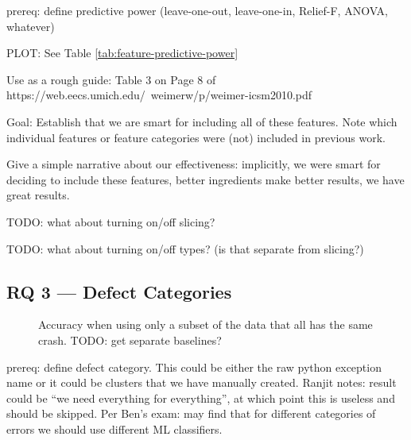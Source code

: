 \documentclass[conference]{IEEEtran}
\begin{document}
prereq: define predictive power (leave-one-out, leave-one-in, Relief-F,
ANOVA, whatever)

PLOT: See Table \ref{tab:feature-predictive-power}

Use as a rough guide: Table 3 on Page 8 of
https://web.eecs.umich.edu/~weimerw/p/weimer-icsm2010.pdf

Goal: Establish that we are smart for including all of these features. Note
which individual features or feature categories were (not) included in
previous work.

Give a simple narrative about our effectiveness: implicitly, we were smart
for deciding to include these features, better ingredients make better
results, we have great results.

TODO: what about turning on/off slicing?

TODO: what about turning on/off types? (is that separate from slicing?)

\subsection{RQ 3 --- Defect Categories}

\begin{figure}
\caption{Accuracy when using only a subset of the data that all has the same crash. TODO:
get separate baselines?}
\label{fig:defect-categories}
\end{figure}

prereq: define defect category. This could be either the raw python
exception name or it could be clusters that we have manually created.
Ranjit notes: result could be ``we need everything for everything'', at
which point this is useless and should be skipped. Per Ben's exam: may find
that for different categories of errors we should use different ML
classifiers.
\end{document}
